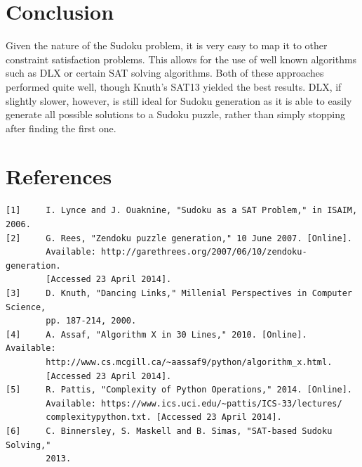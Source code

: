 \documentclass[12pt]{article}
\begin{document}
\section{Conclusion}
Given the nature of the Sudoku problem, it is very easy to map it to other constraint satisfaction problems. This allows for the use of well known algorithms such as DLX or certain SAT solving algorithms. Both of these approaches performed quite well, though Knuth's SAT13 yielded the best results. DLX, if slightly slower, however, is still ideal for Sudoku generation as it is able to easily generate all possible solutions to a Sudoku puzzle, rather than simply stopping after finding the first one.
\section{References}
\begin{verbatim}
[1] 	I. Lynce and J. Ouaknine, "Sudoku as a SAT Problem," in ISAIM, 2006. 
[2] 	G. Rees, "Zendoku puzzle generation," 10 June 2007. [Online]. 
        Available: http://garethrees.org/2007/06/10/zendoku-generation.
        [Accessed 23 April 2014].
[3] 	D. Knuth, "Dancing Links," Millenial Perspectives in Computer Science,
        pp. 187-214, 2000. 
[4] 	A. Assaf, "Algorithm X in 30 Lines," 2010. [Online]. Available:
        http://www.cs.mcgill.ca/~aassaf9/python/algorithm_x.html.
        [Accessed 23 April 2014].
[5] 	R. Pattis, "Complexity of Python Operations," 2014. [Online].
        Available: https://www.ics.uci.edu/~pattis/ICS-33/lectures/
        complexitypython.txt. [Accessed 23 April 2014].
[6] 	C. Binnersley, S. Maskell and B. Simas, "SAT-based Sudoku Solving,"
        2013.
\end{verbatim}
\end{document}
